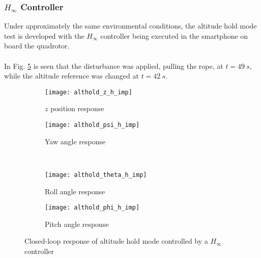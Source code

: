 \subsubsection{$H_\infty$ Controller}
Under approximately the same environmental conditions, the altitude hold mode test is developed with the $H_\infty$ controller being executed in the smartphone on board the quadrotor.
\\\\
In Fig. \ref{fig:althold_h_imp} is seen that the disturbance was applied, pulling the rope, at $t = 49\ s$, while the altitude reference was changed at $t = 42\ s$.
\begin{figure}[H]
\begin{subfigure}{.5\linewidth}
\centering
\texttt{[image: althold\_z\_h\_imp]}
\caption{$z$ position response}
\label{fig:althold_z_h_imp}
\end{subfigure}%
\begin{subfigure}{.5\linewidth}
\centering
\texttt{[image: althold\_psi\_h\_imp]}
\caption{Yaw angle response}
\label{fig:althold_psi_h_imp}
\end{subfigure}\\[1ex]
\begin{subfigure}{0.5\linewidth}
\centering
\texttt{[image: althold\_theta\_h\_imp]}
\caption{Roll angle response}
\label{fig:althold_theta_h_imp}
\end{subfigure}
\begin{subfigure}{0.5\linewidth}
\centering
\texttt{[image: althold\_phi\_h\_imp]}
\caption{Pitch angle response}
\label{fig:althold_phi_h_imp}
\end{subfigure}
\caption{Closed-loop response of altitude hold mode controlled by a $H_\infty$ controller}
\label{fig:althold_h_imp}
\end{figure}

